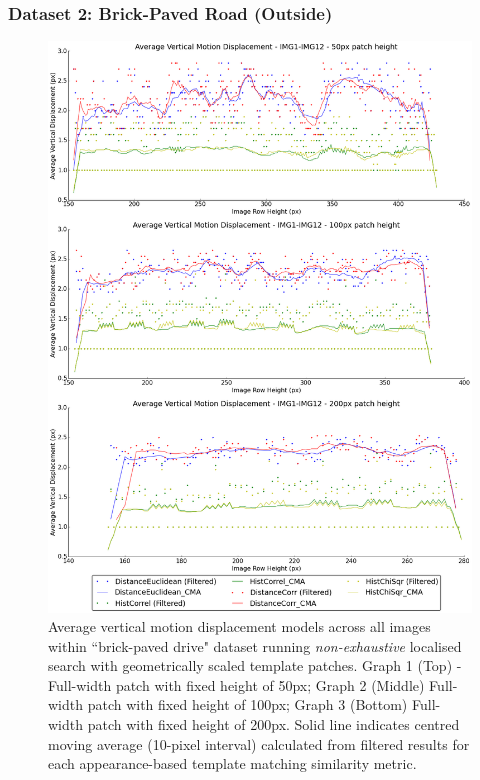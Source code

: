 \clearpage
\subsubsection{Dataset 2: Brick-Paved Road (Outside)}

\begin{figure}[ht!]
\centering
\includegraphics[scale=0.3]{images/results/wiltshire_outside_10cm_scaled}
\caption{Average vertical motion displacement models across all images within ``brick-paved drive" dataset running \textit{non-exhaustive} localised search with geometrically scaled template patches. Graph 1 (Top) - Full-width patch with fixed height of 50px; Graph 2 (Middle) Full-width patch with fixed height of 100px; Graph 3 (Bottom) Full-width patch with fixed height of 200px. Solid line indicates centred moving average (10-pixel interval) calculated from filtered results for each appearance-based template matching similarity metric.}
\label{fig:ex3_2_1}
\end{figure}

